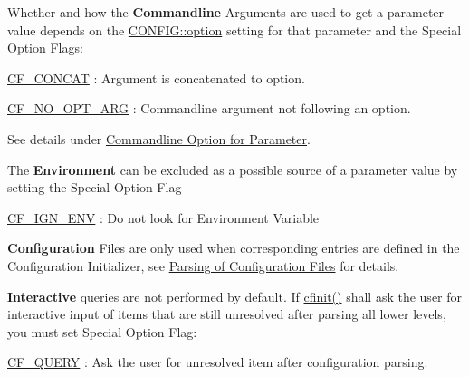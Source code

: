 Whether and how the {\bfseries Commandline} Arguments are used to get a parameter value depends on the \hyperlink{struct_c_o_n_f_i_g_a60563bd93e85c1ddb8291a2d27a9c472}{C\-O\-N\-F\-I\-G\-::option} setting for that parameter and the Special Option Flags\-:


\begin{DoxyItemize}
\item \hyperlink{group__special__options__mask_ga9e526dae88bf6803772107ff283637b5}{C\-F\-\_\-\-C\-O\-N\-C\-A\-T} \-: Argument is concatenated to option. 
\begin{DoxyItemize}
\item \hyperlink{group__special__options__mask_ga97d17b070dac10c14d3930c58bfba76f}{C\-F\-\_\-\-N\-O\-\_\-\-O\-P\-T\-\_\-\-A\-R\-G} \-: Commandline argument not following an option. 
\end{DoxyItemize}
\end{DoxyItemize}

See details under \hyperlink{config_initializer_parameter_option}{Commandline Option for Parameter}.

The {\bfseries Environment} can be excluded as a possible source of a parameter value by setting the Special Option Flag


\begin{DoxyItemize}
\item \hyperlink{group__special__options__mask_ga72b75851880f36aaa5a52fdfe7960cca}{C\-F\-\_\-\-I\-G\-N\-\_\-\-E\-N\-V} \-: Do not look for Environment Variable
\end{DoxyItemize}

{\bfseries Configuration} Files are only used when corresponding entries are defined in the Configuration Initializer, see \hyperlink{config_levels_config_file_parsing}{Parsing of Configuration Files} for details.

{\bfseries Interactive} queries are not performed by default. If \hyperlink{group__cflib__core_ga64fb341565c2ddfccd6669e5e6265a8a}{cfinit()} shall ask the user for interactive input of items that are still unresolved after parsing all lower levels, you must set Special Option Flag\-:


\begin{DoxyItemize}
\item \hyperlink{group__special__options__mask_gae39e0d9b4e9af8c6d4b3676783dd26e0}{C\-F\-\_\-\-Q\-U\-E\-R\-Y} \-: Ask the user for unresolved item after configuration parsing. 
\end{DoxyItemize}

